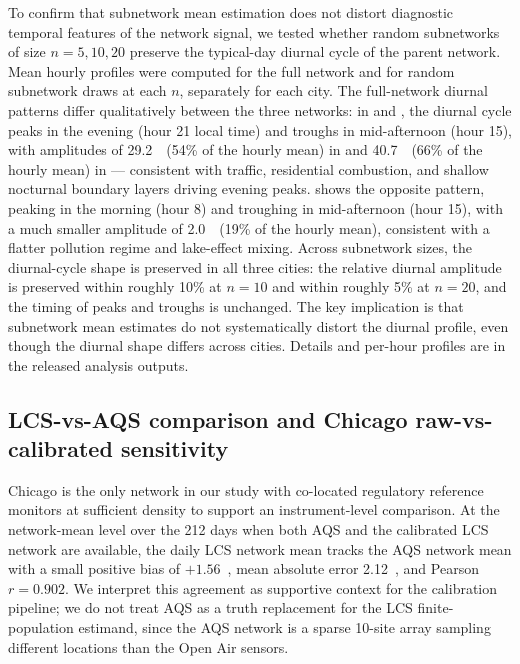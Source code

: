 To confirm that subnetwork mean estimation does not distort diagnostic temporal features of the network signal, we tested whether random subnetworks of size $n = 5, 10, 20$ preserve the typical-day diurnal cycle of the parent network. Mean hourly profiles were computed for the full network and for random subnetwork draws at each $n$, separately for each city. The full-network diurnal patterns differ qualitatively between the three networks: in  and , the diurnal cycle peaks in the evening (hour 21 local time) and troughs in mid-afternoon (hour 15), with amplitudes of 29.2~\units\ (54\% of the hourly mean) in  and 40.7~\units\ (66\% of the hourly mean) in  --- consistent with traffic, residential combustion, and shallow nocturnal boundary layers driving evening peaks.  shows the opposite pattern, peaking in the morning (hour 8) and troughing in mid-afternoon (hour 15), with a much smaller amplitude of 2.0~\units\ (19\% of the hourly mean), consistent with a flatter pollution regime and lake-effect mixing. Across subnetwork sizes, the diurnal-cycle shape is preserved in all three cities: the relative diurnal amplitude is preserved within roughly 10\% at $n=10$ and within roughly 5\% at $n=20$, and the timing of peaks and troughs is unchanged. The key implication is that subnetwork mean estimates do not systematically distort the diurnal profile, even though the diurnal shape differs across cities. Details and per-hour profiles are in the released analysis outputs.

\subsection{LCS-vs-AQS comparison and Chicago raw-vs-calibrated sensitivity}\label{sec:si_chicago_sensitivity}

Chicago is the only network in our study with co-located regulatory reference monitors at sufficient density to support an instrument-level comparison. At the network-mean level over the 212 days when both AQS and the calibrated LCS network are available, the daily LCS network mean tracks the AQS network mean with a small positive bias of $+1.56$~\units, mean absolute error 2.12~\units, and Pearson $r = 0.902$. We interpret this agreement as supportive context for the calibration pipeline; we do not treat AQS as a truth replacement for the LCS finite-population estimand, since the AQS network is a sparse 10-site array sampling different locations than the Open Air sensors.

